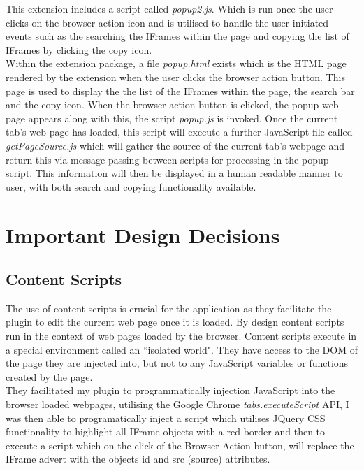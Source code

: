 \documentclass[12pt]{article}
\begin{document}
This extension includes a script called \textit{popup2.js}. Which is run once the user clicks on the browser action icon and is utilised to handle the user initiated events such as the searching the IFrames within the page and copying the list of IFrames by clicking the copy icon. \\

Within the extension package, a file \textit{popup.html} exists which is the HTML page rendered by the extension when the user clicks the browser action button. This page is used to display the the list of the IFrames within the page, the search bar and the copy icon. When the browser action button is clicked, the popup web-page appears along with this, the script \textit{popup.js} is invoked. Once the current tab's web-page has loaded, this script will execute a further JavaScript file called \textit{getPageSource.js} which will gather the source of the current tab's webpage and return this via message passing between scripts for processing in the popup script. This information will then be displayed in a human readable manner to user, with both search and copying functionality available.

\section{Important Design Decisions}

\subsection{Content Scripts} \label{Content_Scripts}
The use of content scripts is crucial for the application as they facilitate the plugin to edit the current web page once it is loaded. By design content scripts run in the context of web pages loaded by the browser. Content scripts execute in a special environment called an ``isolated world". They have access to the DOM of the page they are injected into, but not to any JavaScript variables or functions created by the page. \\ 

They facilitated my plugin to programmatically injection JavaScript into the browser loaded webpages, utilising the Google Chrome \textit{tabs.executeScript} API, I was then able to programatically inject a script which utilises JQuery CSS functionality to highlight all IFrame objects with a red border and then to execute a script which on the click of the Browser Action button, will replace the IFrame advert with the objects id and src (source) attributes.  \\
\end{document}
